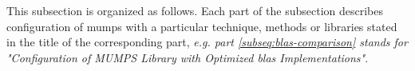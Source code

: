 This subsection is organized as follows. Each part of the subsection describes configuration of \acrshort{mumps} with a particular technique, methods or libraries stated in the title of the corresponding part, \textit{e.g. part \ref{subseq:blas-comparison} stands for "Configuration of MUMPS Library with Optimized \acrshort{blas} Implementations"}.\\